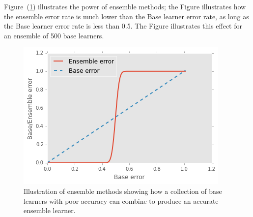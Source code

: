 \documentclass[a4paper,11pt]{article}
\begin{document}




Figure~(\ref{fig:ensemble}) illustrates the power of ensemble methods; the Figure illustrates how the ensemble error rate is much lower than the Base learner error rate, as long as the Base learner error rate is less than 0.5. The Figure illustrates this effect for an ensemble of 500 base learners.








\begin{figure}[!ht]
  \centering
    \includegraphics[scale=1.0]{ensemble}
\caption{\label{fig:ensemble} Illustration of ensemble methods showing how a collection of base learners with poor accuracy can combine to produce an accurate ensemble learner.}
\end{figure}
\end{document}
